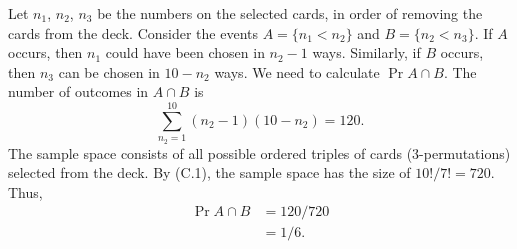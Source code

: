 Let $n_1$, $n_2$, $n_3$ be the numbers on the selected cards, in order of removing the cards from the deck.
Consider the events $A=\{n_1<n_2\}$ and $B=\{n_2<n_3\}$.
If $A$ occurs, then $n_1$ could have been chosen in $n_2-1$ ways.
Similarly, if $B$ occurs, then $n_3$ can be chosen in $10-n_2$ ways.
We need to calculate $\Pr{A\cap B}$.
The number of outcomes in $A\cap B$ is
\[
    \sum_{n_2=1}^{10}(n_2-1)(10-n_2) = 120.
\]
The sample space consists of all possible ordered triples of cards (3-permutations) selected from the deck.
By (C.1), the sample space has the size of $10!/7!=720$.
Thus,
\begin{align*}
    \Pr{A\cap B} &= 120/720 \\
    &= 1/6.
\end{align*}
